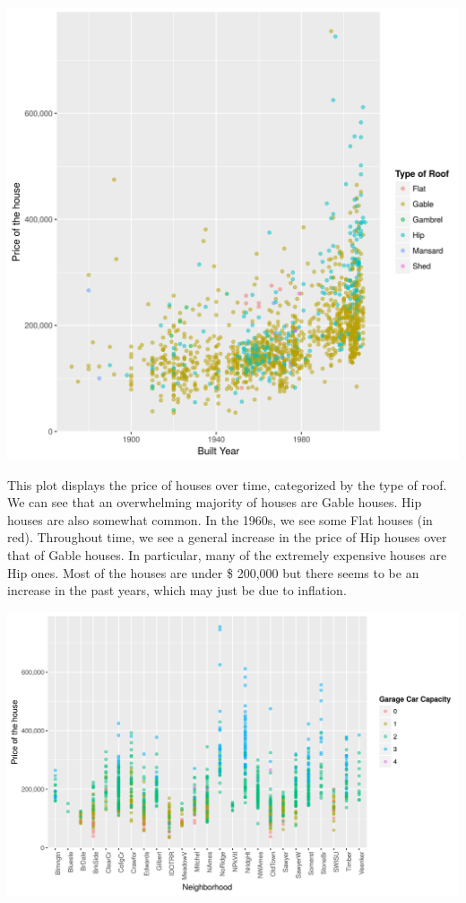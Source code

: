 \documentclass[12pt]{article}
\begin{document}
\begin{flushleft}
\includegraphics[scale = 0.40]{plot2.png}

\begin{flushleft}

This plot displays the price of houses over time, categorized by the type of roof. We can see that an overwhelming majority of houses are Gable houses. Hip houses are also somewhat common. In the 1960s, we see some Flat houses (in red). Throughout time, we see a general increase in the price of Hip houses over that of Gable houses. In particular, many of the extremely expensive houses are Hip ones. Most of  the houses are under \$ 200,000 but there seems to be an increase in the past years, which may just be due to inflation.
\end{flushleft}

\includegraphics[scale = .6]{neighborhood.png}


\end{flushleft}
\end{document}
